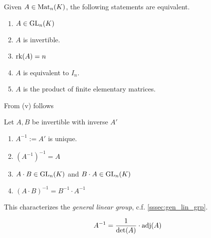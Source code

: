 \begin{proposition}\label{pro:invertible_mat}
   Given \(A \in \operatorname{Mat}_n(K)\), the following statements are equivalent.
   \begin{enumerate}[label=\roman*, align=Center]
      \item \(A \in \operatorname{GL}_n(K)\)
      \item \(A\) is invertible.
      \item \(\operatorname{rk}(A) = n\)
      \item \(A\) is equivalent to \(I_n\).
      \item \(A\) is the product of finite elementary matrices.
   \end{enumerate}
\end{proposition}

From  (v) follows
\begin{proposition}
   Let \(A, B\) be invertible with inverse \(A'\)
   \begin{enumerate}[label=\roman*, align=Center]
      \item \(A^{-1} := A'\) is unique.
      \item \((A^{-1})^{-1} = A\)
      \item \(A \cdot B \in \operatorname{GL}_n(K)\) and \(B \cdot A \in \operatorname{GL}_n(K)\)
      \item \((A \cdot B)^{-1} = B^{-1} \cdot A^{-1}\)
   \end{enumerate}
\end{proposition}
\begin{remark}
   This characterizes the \emph{general linear group}, c.f. \cref{sssec:gen_lin_grp}.
\end{remark}

\begin{remark}
   \[A^{-1} = \frac{1}{\det(A)} \cdot \operatorname{adj}(A)\]
\end{remark}

